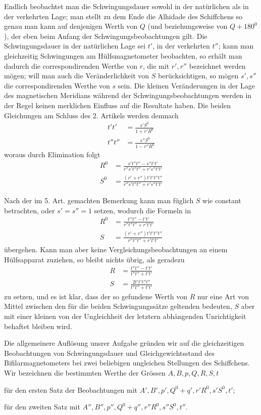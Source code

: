 Endlich beobachtet man die Schwingungsdauer sowohl in der natürlichen als in der verkehrten Lage; man stellt zu dem Ende die Alhidade des Schiffchens so genau man kann auf denjenigen Werth von $Q$ (und beziehungsweise von $Q+180^0$), der eben beim Anfang der Schwingungsbeobachtungen gilt. Die Schwingungsdauer in der natürlichen Lage sei $t'$, in der verkehrten $t''$; kann man gleichzeitig Schwingungen am Hülfsmagnetometer beobachten, so erhält man dadurch die correspondirenden Werthe von $r$, die mit $r',r''$ bezeichnet werden mögen; will man auch die Veränderlichkeit von $S$ berücksichtigen, so mögen $s',s''$ die correspondirenden Werthe von $s$ sein. Die kleinen Veränderungen in der Lage des magnetischen Meridians während der Schwingungsbeobachtungen
werden in der Regel keinen merklichen Einfluss auf die Resultate haben. Die beiden Gleichungen am Schluss des 2. Artikels werden demnach
\[
\begin{aligned}
t't'&=\frac{s'S^0}{1+r'R^0}\\
t''t''&=\frac{s''S^0}{1-r''R^0}
\end{aligned}
\]
woraus durch Elimination folgt
\[
\begin{aligned}
R^0&=\frac{s't''t''-s''t't'}{r''s't''t''+r's''t't'}\\
S^0&=\frac{(r'+r'')t't't''t''}{r''s't''t''+r's''t't'}
\end{aligned}
\]

Nach der im 5. Art. gemachten Bemerkung kann man füglich $S$ wie constant betrachten, oder $s'=s''=1$ setzen, wodurch die Formeln in
\[
\begin{aligned}
R^0&=\frac{t''t''-t't'}{r''t''t''+r't't'}\\
S&=\frac{(r'+r'')t't't''t''}{r''t''t''+r't't'}
\end{aligned}
\]
übergehen. Kann man aber keine Vergleichungsbeobachtungen an einem Hülfsapparat zuziehen, so bleibt nichts übrig, als geradezu
\[
\begin{aligned}
R&=\frac{t''t''-t't'}{t''t''+t't'}\\
S&=\frac{2t't't''t''}{t''t''+t't'}
\end{aligned}
\]
zu setzen, und es ist klar, dass der so gefundene Werth von $R$ nur eine Art von Mittel zwischen den für die beiden Schwingungssätze geltenden bedeuten, $S$ aber mit einer kleinen von der Ungleichheit der letztern abhängenden Unrichtigkeit behaftet bleiben wird.

Die allgemeinere Auflösung unsrer Aufgabe gründen wir auf die gleichzeitigen Beobachtungen von Schwingungsdauer und Gleichgewichtsstand des Bifilarmagnetometers bei zwei beliebigen ungleichen Stellungen des Schiffchens. Wir bezeichnen die bestimmten Werthe der Grössen $A,B,p,Q,R,S,t$

für den ersten Satz der Beobachtungen mit $A',B',p',Q^0+q',r'R^0,s'S^0,t'$;

für den zweiten Satz mit $A'',B'',p'',Q^0+q'',r''R^0,s''S^0,t''$.

